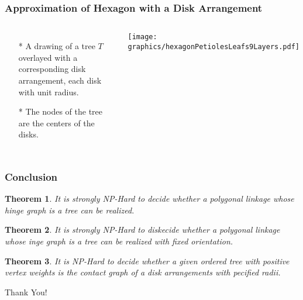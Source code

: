 \documentclass{beamer}
\newtheorem{thm}{Theorem}
\begin{document}
\begin{frame} \frametitle{Approximation of Hexagon with a Disk Arrangement}
    \begin{columns}[c]
        \begin{itemize}
            \item[*] A drawing of a tree $T$ overlayed with a corresponding disk arrangement, each disk with unit radius.
            \item[*] The nodes of the tree are the centers of the disks.
        \end{itemize}
        \begin{minipage}{\linewidth}
            \begin{center}
            \texttt{[image: graphics/hexagonPetiolesLeafs9Layers.pdf]}\label{gfx:hexagonPetiolesLeafs9Layers.pdf}
            \end{center}
        \end{minipage}
    \end{columns}
\end{frame}
\begin{frame}\frametitle{Conclusion}
\begin{thm}
     It is strongly NP-Hard to decide whether a polygonal linkage whose hinge graph is a \textit{tree} can be realized.
     \end{thm}
    \begin{thm}It is strongly NP-Hard to diskecide whether a polygonal linkage whose inge graph is a \textit{tree} can be realized with fixed orientation.\end{thm}
    \begin{thm}It is NP-Hard to decide whether a given ordered tree with positive vertex weights is the contact graph of a disk arrangements with pecified radii.\end{thm}
\end{frame}

\begin{frame}
\begin{center}
Thank You!
\end{center}
\end{frame}
\end{document}
